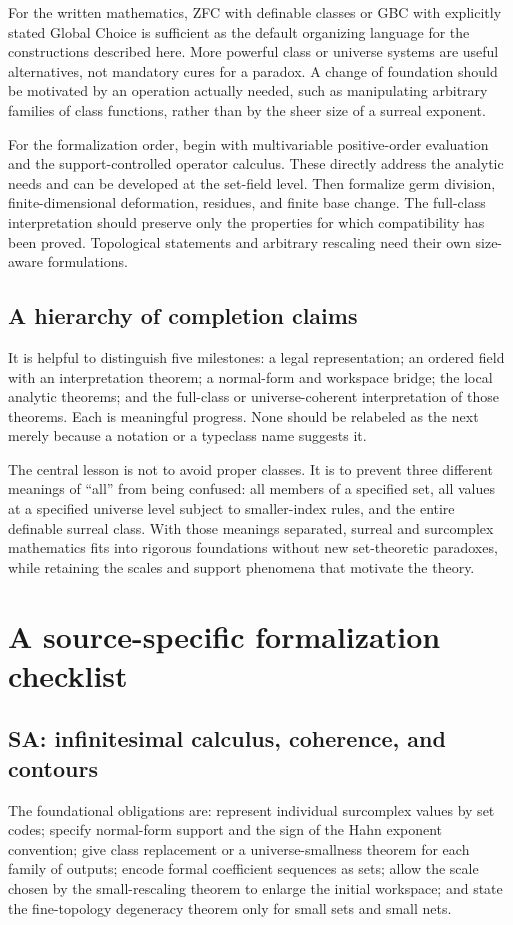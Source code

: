 \documentclass[11pt,letterpaper]{article}
\theoremstyle{definition}
\theoremstyle{remark}
\numberwithin{equation}{section}
\begin{document}
For the written mathematics, ZFC with definable classes or GBC with explicitly stated Global Choice is sufficient as the default organizing language for the constructions described here. More powerful class or universe systems are useful alternatives, not mandatory cures for a paradox. A change of foundation should be motivated by an operation actually needed, such as manipulating arbitrary families of class functions, rather than by the sheer size of a surreal exponent.

For the formalization order, begin with multivariable positive-order evaluation and the support-controlled operator calculus. These directly address the analytic needs and can be developed at the set-field level. Then formalize germ division, finite-dimensional deformation, residues, and finite base change. The full-class interpretation should preserve only the properties for which compatibility has been proved. Topological statements and arbitrary rescaling need their own size-aware formulations.

\subsection{A hierarchy of completion claims}
It is helpful to distinguish five milestones: a legal representation; an ordered field with an interpretation theorem; a normal-form and workspace bridge; the local analytic theorems; and the full-class or universe-coherent interpretation of those theorems. Each is meaningful progress. None should be relabeled as the next merely because a notation or a typeclass name suggests it.

The central lesson is not to avoid proper classes. It is to prevent three different meanings of ``all'' from being confused: all members of a specified set, all values at a specified universe level subject to smaller-index rules, and the entire definable surreal class. With those meanings separated, surreal and surcomplex mathematics fits into rigorous foundations without new set-theoretic paradoxes, while retaining the scales and support phenomena that motivate the theory.

\appendix
\section{A source-specific formalization checklist}\label{app:checklist}

\subsection{SA: infinitesimal calculus, coherence, and contours}
The foundational obligations are: represent individual surcomplex values by set codes; specify normal-form support and the sign of the Hahn exponent convention; give class replacement or a universe-smallness theorem for each family of outputs; encode formal coefficient sequences as sets; allow the scale chosen by the small-rescaling theorem to enlarge the initial workspace; and state the fine-topology degeneracy theorem only for small sets and small nets.
\end{document}

